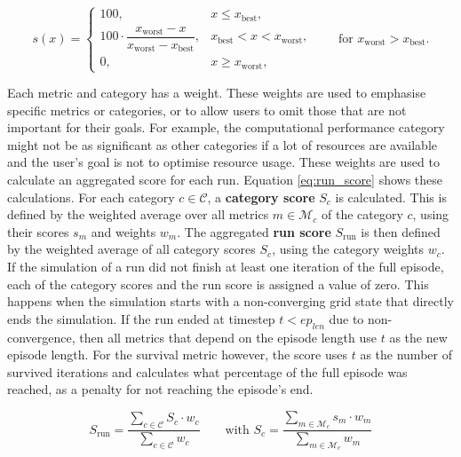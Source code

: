 \begin{equation}
s(x) =
\begin{cases}
100, & x \leq x_{\mathrm{best}}, \\[4pt]
100 \cdot \dfrac{x_{\mathrm{worst}} - x}{x_{\mathrm{worst}} - x_{\mathrm{best}}},
& x_{\mathrm{best}} < x < x_{\mathrm{worst}}, \\[8pt]
0, & x \geq x_{\mathrm{worst}},
\end{cases}
\qquad
\text{for } x_{\mathrm{worst}} > x_{\mathrm{best}}.
\label{eq:linear_metric_score_decreasing}
\end{equation}

Each metric and category has a weight. These weights are used to emphasise specific metrics or categories, or to allow users to omit those that are not important for their goals. For example, the computational performance category might not be as significant as other categories if a lot of resources are available and the user's goal is not to optimise resource usage. 
These weights are used to calculate an aggregated score for each run. Equation \eqref{eq:run_score} shows these calculations. For each category $c \in \mathcal{C}$, a \textbf{category score} $S_c$ is calculated. 
This is defined by the weighted average over all metrics $m \in \mathcal{M}_c$ of the category $c$, using their scores $s_m$ and weights $w_m$. The aggregated \textbf{run score} $S_{\text{run}}$ is then defined by the weighted average of all category scores $S_c$, using the category weights $w_c$. If the simulation of a run did not finish at least one iteration of the full episode, each of the category scores and the run score is assigned a value of zero. 
This happens when the simulation starts with a non-converging grid state that directly ends the simulation. If the run ended at timestep $t < ep_{len}$ due to non-convergence, then all metrics that depend on the episode length use $t$ as the new episode length. For the survival metric however, the score uses $t$ as the number of survived iterations and calculates what percentage of the full episode was reached, as a penalty for not reaching the episode's end.

\begin{equation}
S_{\text{run}} = \frac{\displaystyle\sum_{c \in \mathcal{C}} S_c \cdot w_c}{\displaystyle\sum_{c \in \mathcal{C}} w_c}
\qquad 
\text{with } S_c = \frac{\displaystyle\sum_{m \in \mathcal{M}_c} s_m \cdot w_m}{\displaystyle\sum_{m \in \mathcal{M}_c} w_m}
\label{eq:run_score}
\end{equation}

